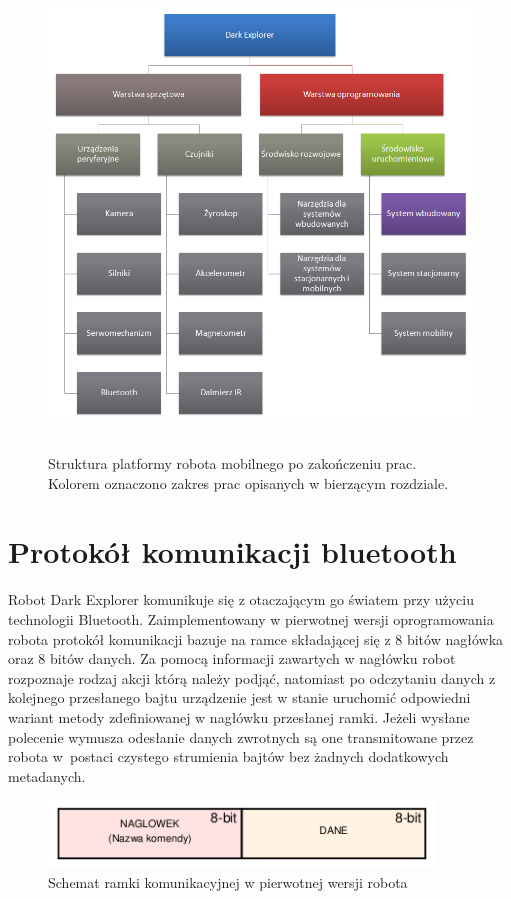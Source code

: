 \begin{figure}[!ht]
 \centering
 \includegraphics[height=125mm]{../images/ch05/dark_explorer_platform_firmware.png}
 \caption{Struktura platformy robota mobilnego po zakończeniu prac. Kolorem oznaczono zakres prac opisanych w bierzącym rozdziale.}
 \label{fig:DarkExplorerPlatformFirmWare}
\end{figure}

\section{Protokół komunikacji bluetooth}
\label{sec:bt-comm}
Robot Dark Explorer komunikuje się z otaczającym go światem przy użyciu
technologii Bluetooth. Zaimplementowany w pierwotnej wersji oprogramowania
robota protokół komunikacji bazuje na ramce składającej się z 8 bitów nagłówka oraz 8 bitów
danych. Za pomocą informacji zawartych w nagłówku robot rozpoznaje
rodzaj akcji którą należy podjąć, natomiast po odczytaniu danych z kolejnego
przesłanego bajtu urządzenie jest w stanie uruchomić odpowiedni wariant metody
zdefiniowanej w nagłówku przesłanej ramki. Jeżeli wysłane polecenie wymusza
odesłanie danych zwrotnych są one transmitowane przez robota w~postaci czystego
strumienia bajtów bez żadnych dodatkowych metadanych.

\begin{figure}[h!]
 \centering
 \includegraphics[height=18mm]{../images/ch05/old_req_schema.png}
 \caption{Schemat ramki komunikacyjnej w pierwotnej wersji robota}
 \label{fig:OldCommFrame}
\end{figure}

